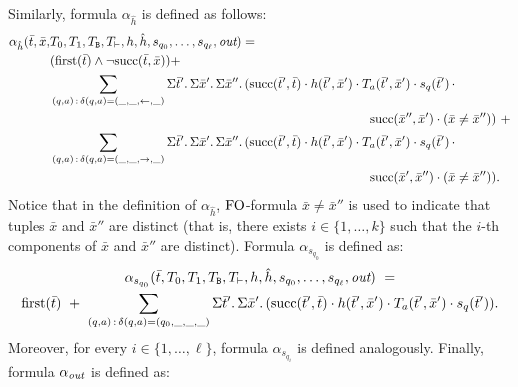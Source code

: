 Similarly, formula $\alpha_{\hat{h}}$ is defined as follows:
\begin{align*}
\alpha_{\hat{h}}(\bar{t},\bar{x},&T_0,T_1,T_{\ttB},T_{\vdash},h,\hat{h},s_{q_0},\ldots,s_{q_{\ell}},\out) = \\
&(\first(\bar{t}) \wedge \neg\successor(\bar{t},\bar{x})) + \\
&\sum_{(q,a) \,:\, \delta(q,a) = (\_,\_,\leftarrow,\_)}\sa{\bar{t}'}\sa{\bar{x}'}\sa{\bar{x}''}(\successor(\bar{t}',\bar{t}) \mult h(\bar{t}',\bar{x}') \mult T_a(\bar{t}',\bar{x}') \mult s_{q}(\bar{t}') \, \mult \\
&\hspace{250pt} \successor(\bar{x}'',\bar{x}') \mult (\bar{x} \neq \bar{x}'')) \ + \\
&\sum_{(q,a) \,:\, \delta(q,a) = (\_,\_,\rightarrow,\_)}\sa{\bar{t}'}\sa{\bar{x}'}\sa{\bar{x}''}(\successor(\bar{t}',\bar{t}) \mult h(\bar{t}',\bar{x}') \mult T_a(\bar{t}',\bar{x}') \mult s_{q}(\bar{t}') \, \mult \\
&\hspace{250pt} \successor(\bar{x}',\bar{x}'') \mult (\bar{x} \neq \bar{x}'')).
\end{align*}
Notice that in the definition of $\alpha_{\hat{h}}$, ${\rm FO}$-formula $\bar{x} \neq \bar{x}''$ is used to indicate that tuples $\bar{x}$ and $\bar{x}''$ are distinct (that is, there exists $i \in \{1, \ldots, k\}$ such that the $i$-th components of $\bar{x}$ and $\bar{x}''$ are distinct). 
Formula $\alpha_{s_{q_0}}$ is defined as:
\begin{multline*}
\alpha_{s_{q_0}}(\bar{t},T_0,T_1,T_{\mathtt{B}},T_{\vdash},h,\hat{h},s_{q_0},\ldots,s_{q_{\ell}},\text{\it out}) \ = \\ 
\operatorname{first}(\bar{t}) \ + \
\sum_{(q,a) \,:\, \delta(q,a) = (q_0,\_,\_,\_)}\Sigma{\bar{t}'}.\,\Sigma{\bar{x}'}.\,(\text{succ}(\bar{t}',\bar{t}) \cdot h(\bar{t}',\bar{x}') \cdot T_a(\bar{t}',\bar{x}') \cdot  s_{q}(\bar{t}')).
\end{multline*}
Moreover, for every $i \in \{1, \ldots, \ell\}$, formula $\alpha_{s_{q_i}}$ is defined analogously.
Finally, formula $\alpha_{\text{\it out}}$ is defined as:

